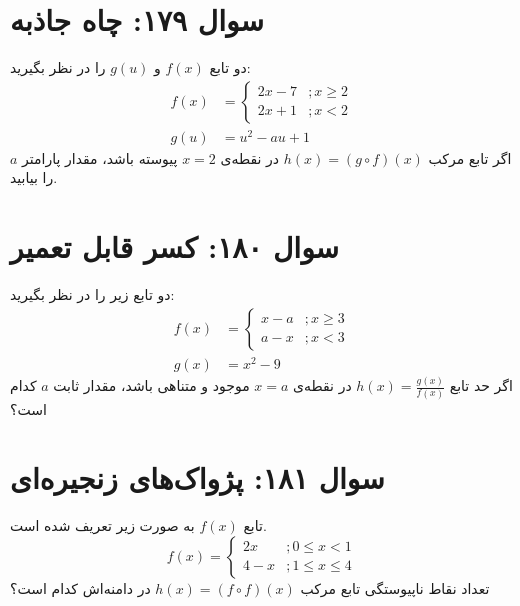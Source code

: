 \documentclass[12pt]{article}
\begin{document}
\vspace{1cm}
\hrulefill
\vspace{1cm}

\section*{سوال ۱۷۹: چاه جاذبه}
دو تابع \(f(x)\) و \(g(u)\) را در نظر بگیرید:
\begin{align*}
	f(x) &= \begin{cases} 2x-7 &; x \ge 2 \\ 2x+1 &; x < 2 \end{cases} \\
	g(u) &= u^2 - au + 1
\end{align*}
اگر تابع مرکب \( h(x) = (g \circ f)(x) \) در نقطه‌ی \(x=2\) پیوسته باشد، مقدار پارامتر \(a\) را بیابید.

\vspace{1cm}
\hrulefill
\vspace{1cm}

\section*{سوال ۱۸۰: کسر قابل تعمیر}
دو تابع زیر را در نظر بگیرید:
\begin{align*}
	f(x) &= \begin{cases} x-a &; x \ge 3 \\ a-x &; x < 3 \end{cases} \\
	g(x) &= x^2-9
\end{align*}
اگر حد تابع \( h(x) = \frac{g(x)}{f(x)} \) در نقطه‌ی \(x=a\) موجود و متناهی باشد، مقدار ثابت \(a\) کدام است؟

\vspace{1cm}
\hrulefill
\vspace{1cm}

\section*{سوال ۱۸۱: پژواک‌های زنجیره‌ای}
تابع \(f(x)\) به صورت زیر تعریف شده است.
\begin{displaymath}
	f(x) = 
	\begin{cases}
		2x & ; 0 \le x < 1 \\
		4-x & ; 1 \le x \le 4
	\end{cases}
\end{displaymath}
تعداد نقاط ناپیوستگی تابع مرکب \( h(x) = (f \circ f)(x) \) در دامنه‌اش کدام است؟
\end{document}
